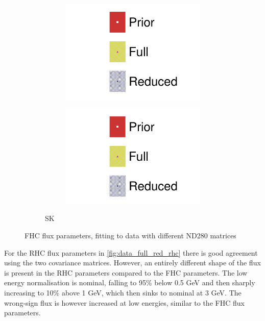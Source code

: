 \begin{figure}[h]
\begin{subfigure}[t]{\textwidth}
\begin{subfigure}[t]{0.24\textwidth}
	\includegraphics[width=\textwidth,page=12, trim={0mm 0mm 0mm 9mm}, clip]{figures/mach3/2018/data/2018a_FixedCov_FullCov_Mpi_Data_merg_2018a_FixedCov_RedCov_Mpi_Data_merge}
\end{subfigure}
\begin{subfigure}[t]{0.24\textwidth}
	\includegraphics[width=\textwidth,page=13, trim={0mm 0mm 0mm 9mm}, clip]{figures/mach3/2018/data/2018a_FixedCov_FullCov_Mpi_Data_merg_2018a_FixedCov_RedCov_Mpi_Data_merge}
\end{subfigure}
\caption{SK}
\end{subfigure}
	\caption{FHC flux parameters, fitting to data with different ND280 matrices}
	\label{fig:data_full_red_fhc}
\end{figure}

For the RHC flux parameters in \autoref{fig:data_full_red_rhc} there is good agreement using the two covariance matrices. However, an entirely different shape of the flux is present in the RHC parameters compared to the FHC parameters. The low energy normalisation is nominal, falling to 95\% below 0.5 GeV and then sharply increasing to 10\% above 1 GeV, which then sinks to nominal at 3 GeV. The wrong-sign flux is however increased at low energies, similar to the FHC flux parameters.

